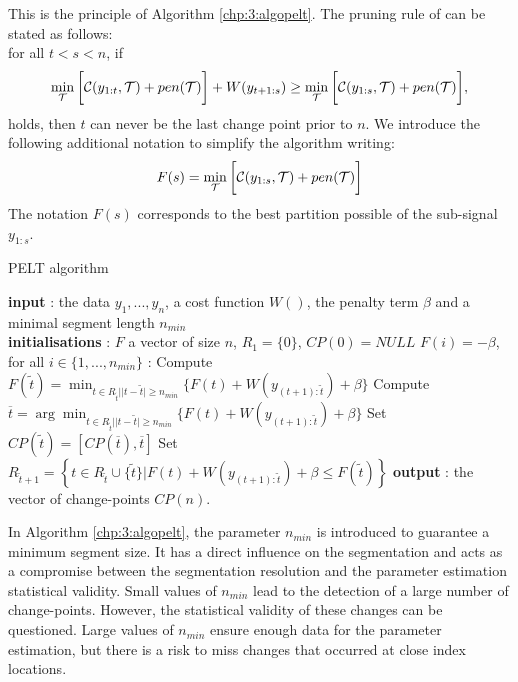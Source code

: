 This is the principle of Algorithm \ref{chp:3:algopelt}. The pruning rule of \cite{Killick2012} can be stated as follows: \\
 for all $t <s < n$, if
\begin{equation}\label{chp:3:pruning}
 \min_{{\mathcal T}}\bigg[{\mathcal C}(y_{1:t},{\mathcal T})+pen({\mathcal T})\bigg] + W(y_{t+1:s}) \geq \min_{{\mathcal T}}\bigg[{\mathcal C}(y_{1:s},{\mathcal T})+pen({\mathcal T})\bigg], 
\end{equation}
holds, then $t$ can never be the last change point prior to $n$. We introduce the following additional notation to simplify the algorithm writing:  
$$F(s) = \min_{{\mathcal T}}\bigg[{\mathcal C}(y_{1:s},{\mathcal T})+pen({\mathcal T})\bigg]$$
The notation $F(s)$ corresponds to the best partition possible of the sub-signal $y_{1:s}$. 
\begin{algorithm}[ht]
\caption{PELT algorithm}\label{chp:3:algopelt}
\begin{algorithmic}
\State \textbf{input} : the data $y_{1},...,y_{n}$, a cost function $W()$, the penalty term $\beta$ and a minimal segment length $n_{min}$ \\
  \State \textbf{initialisations} : $F$ a vector of size $n$, $R_{1}=\lbrace 0\rbrace$, $CP(0)=NULL$  
  \State $F(i) = -\beta$, for all $i \in \{1,...,n_{min}\}$
   :
  \State Compute 
  $ F(\tilde t)=\min_{t\in R_{\tilde t}\vert \lvert t-\tilde{t}\rvert \geq n_{min}}\lbrace F(t)+W(y_{(t+1):\tilde t})+\beta\rbrace $
  \State Compute $ \overline t=\arg \min_{t\in R_{\tilde t}\vert \lvert t-\tilde{t}\rvert \geq n_{min}}\lbrace F(t)+W(y_{(t+1):\tilde t})+\beta\rbrace $ 
  \State Set $CP(\tilde t)=[CP(\overline t), \overline t]$
  \State Set $R_{\tilde t+1}=\left\{t\in R_{\tilde t}\cup \lbrace\tilde t\rbrace \vert F(t)+W(y_{(t+1):\tilde t}) +\beta \le F(\tilde t)   \right\}$ 
\EndFor 
\State \textbf{output} : the vector of change-points $CP(n)$. 
\end{algorithmic}
\end{algorithm} 

In Algorithm \ref{chp:3:algopelt}, the parameter $n_{min}$ is introduced to guarantee a minimum segment size. It has a direct influence on the segmentation and acts as a compromise between the segmentation resolution and the parameter estimation statistical validity. Small values of $n_{min}$ lead to the detection of a large number of change-points. However, the statistical validity of these changes can be questioned. Large values of $n_{min}$ ensure enough data for the parameter estimation, but there is a risk to miss changes that occurred at close index locations.  
  
